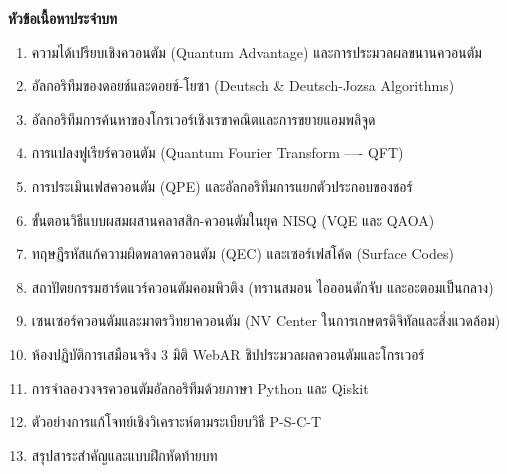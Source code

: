 \begin{lessonplanbox}
\noindent\textbf{หัวข้อเนื้อหาประจำบท}
\begin{enumerate}
    \item ความได้เปรียบเชิงควอนตัม (Quantum Advantage) และการประมวลผลขนานควอนตัม
    \item อัลกอริทึมของดอยช์และดอยช์-โยซา (Deutsch \& Deutsch-Jozsa Algorithms)
    \item อัลกอริทึมการค้นหาของโกรเวอร์เชิงเรขาคณิตและการขยายแอมพลิจูด
    \item การแปลงฟูเรียร์ควอนตัม (Quantum Fourier Transform ---- QFT)
    \item การประเมินเฟสควอนตัม (QPE) และอัลกอริทึมการแยกตัวประกอบของชอร์
    \item ขั้นตอนวิธีแบบผสมผสานคลาสสิก-ควอนตัมในยุค NISQ (VQE และ QAOA)
    \item ทฤษฎีรหัสแก้ความผิดพลาดควอนตัม (QEC) และเซอร์เฟสโค้ด (Surface Codes)
    \item สถาปัตยกรรมฮาร์ดแวร์ควอนตัมคอมพิวติง (ทรานสมอน ไอออนดักจับ และอะตอมเป็นกลาง)
    \item เซนเซอร์ควอนตัมและมาตรวิทยาควอนตัม (NV Center ในการเกษตรดิจิทัลและสิ่งแวดล้อม)
    \item ห้องปฏิบัติการเสมือนจริง 3 มิติ WebAR ชิปประมวลผลควอนตัมและโกรเวอร์
    \item การจำลองวงจรควอนตัมอัลกอริทึมด้วยภาษา Python และ Qiskit
    \item ตัวอย่างการแก้โจทย์เชิงวิเคราะห์ตามระเบียบวิธี P-S-C-T
    \item สรุปสาระสำคัญและแบบฝึกหัดท้ายบท
\end{enumerate}


\end{lessonplanbox}
